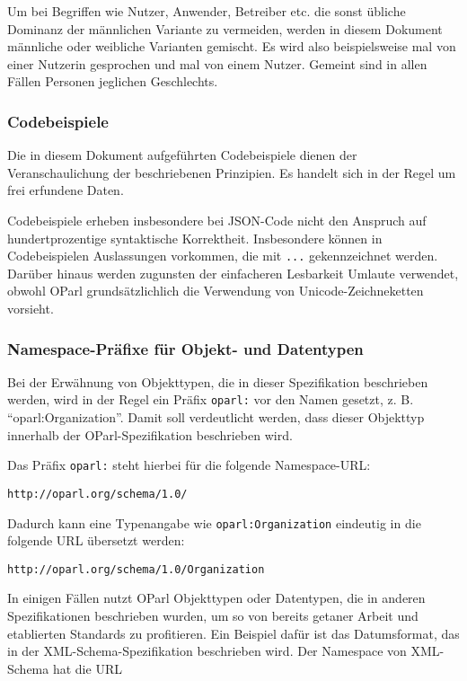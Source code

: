 \documentclass[,a4paper]{article}
\begin{document}
Um bei Begriffen wie Nutzer, Anwender, Betreiber etc. die sonst übliche
Dominanz der männlichen Variante zu vermeiden, werden in diesem Dokument
männliche oder weibliche Varianten gemischt. Es wird also beispielsweise
mal von einer Nutzerin gesprochen und mal von einem Nutzer. Gemeint sind
in allen Fällen Personen jeglichen Geschlechts.

\subsubsection{Codebeispiele}\label{codebeispiele}

Die in diesem Dokument aufgeführten Codebeispiele dienen der
Veranschaulichung der beschriebenen Prinzipien. Es handelt sich in der
Regel um frei erfundene Daten.

Codebeispiele erheben insbesondere bei JSON-Code nicht den Anspruch auf
hundertprozentige syntaktische Korrektheit. Insbesondere können in
Codebeispielen Auslassungen vorkommen, die mit \texttt{...}
gekennzeichnet werden. Darüber hinaus werden zugunsten der einfacheren
Lesbarkeit Umlaute verwendet, obwohl OParl grundsätzlichlich die
Verwendung von Unicode-Zeichneketten vorsieht.

\subsubsection{Namespace-Präfixe für Objekt- und
Datentypen}\label{namespace-pruxe4fixe-fuxfcr-objekt--und-datentypen}

Bei der Erwähnung von Objekttypen, die in dieser Spezifikation
beschrieben werden, wird in der Regel ein Präfix \texttt{oparl:} vor den
Namen gesetzt, z. B. ``oparl:Organization''. Damit soll verdeutlicht
werden, dass dieser Objekttyp innerhalb der OParl-Spezifikation
beschrieben wird.

Das Präfix \texttt{oparl:} steht hierbei für die folgende Namespace-URL:

\begin{verbatim}
http://oparl.org/schema/1.0/
\end{verbatim}

Dadurch kann eine Typenangabe wie \texttt{oparl:Organization} eindeutig
in die folgende URL übersetzt werden:

\begin{verbatim}
http://oparl.org/schema/1.0/Organization
\end{verbatim}

In einigen Fällen nutzt OParl Objekttypen oder Datentypen, die in
anderen Spezifikationen beschrieben wurden, um so von bereits getaner
Arbeit und etablierten Standards zu profitieren. Ein Beispiel dafür ist
das Datumsformat, das in der XML-Schema-Spezifikation beschrieben wird.
Der Namespace von XML-Schema hat die URL
\end{document}
